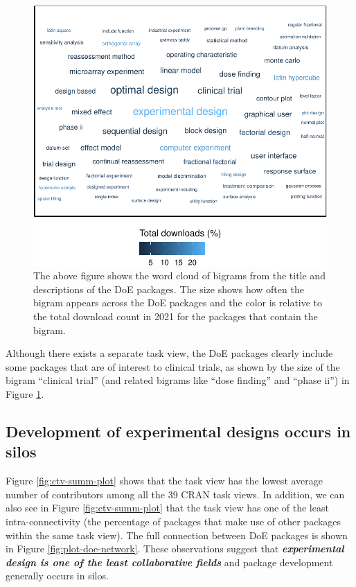 \begin{figure}[htbp]

{\centering \includegraphics{figures/wordcloud-over-time-1} 

}

\caption{The above figure shows the word cloud of bigrams from the title and descriptions of the DoE packages. The size shows how often the bigram appears across the DoE packages and the color is relative to the total download count in 2021 for the packages that contain the bigram.}\label{fig:wordcloud-over-time}
\end{figure}

Although there exists a separate  task view, the DoE packages clearly include some packages that are of interest to clinical trials, as shown by the size of the bigram ``clinical trial'' (and related bigrams like ``dose finding'' and ``phase ii'') in Figure \ref{fig:wordcloud-over-time}.

\hypertarget{development-of-experimental-designs-occur-in-silos}{%
\subsection{Development of experimental designs occurs in silos}\label{development-of-experimental-designs-occur-in-silos}}

Figure \ref{fig:ctv-summ-plot} shows that the  task view has the lowest average number of contributors among all the 39 CRAN task views. In addition, we can also see in Figure \ref{fig:ctv-summ-plot} that the  task view has one of the least intra-connectivity (the percentage of packages that make use of other packages within the same task view). The full connection between DoE packages is shown in Figure \ref{fig:plot-doe-network}. These observations suggest that \textbf{\emph{experimental design is one of the least collaborative fields}} and package development generally occurs in silos.

